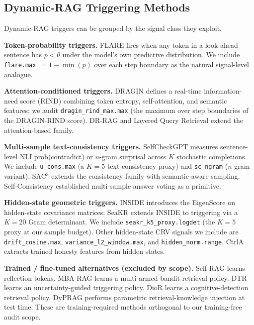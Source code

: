 \documentclass[11pt]{article}
\begin{document}
\subsection{Dynamic-RAG Triggering Methods}
\label{sec:related-triggers}

Dynamic-RAG triggers can be grouped by the signal class they exploit.

\noindent\textbf{Token-probability triggers.} FLARE \citep{Jiang_FLARE} fires
when any token in a look-ahead sentence has $p < \theta$ under the model's
own predictive distribution. We include \texttt{flare.max}~$= 1 - \min(p)$
over each step boundary as the natural signal-level analogue.

\noindent\textbf{Attention-conditioned triggers.} DRAGIN \citep{Su_DRAGIN}
defines a real-time information-need score (RIND) combining token entropy,
self-attention, and semantic features; we audit
\texttt{dragin\_rind\_max.max} (the maximum over step boundaries of the
DRAGIN-RIND score). DR-RAG \citep{Hei_DRRAG} and Layered Query Retrieval
\citep{Huang_LayeredQR} extend the attention-based family.

\noindent\textbf{Multi-sample text-consistency triggers.} SelfCheckGPT
\citep{Manakul_SelfCheckGPT} measures sentence-level NLI prob(contradict) or
$n$-gram surprisal across $K$ stochastic completions. We include
\texttt{u\_cons.max} (a $K{=}5$ text-consistency proxy) and \texttt{sc\_ngram}
($n$-gram variant). SAC$^3$ \citep{Zhang_SAC3} extends the consistency family
with semantic-aware sampling. Self-Consistency \citep{Wang_SelfConsistency}
established multi-sample answer voting as a primitive.

\noindent\textbf{Hidden-state geometric triggers.} INSIDE
\citep{Chen_INSIDE} introduces the EigenScore on hidden-state covariance
matrices; SeaKR \citep{Yao_SeaKR} extends INSIDE to triggering via a
$K{=}20$ Gram determinant. We include \texttt{seakr\_k5\_proxy.logdet} (the
$K{=}5$ proxy at our sample budget). Other hidden-state CRV signals we
include are \texttt{drift\_cosine.max}, \texttt{variance\_l2\_window.max}, and
\texttt{hidden\_norm.range}. CtrlA \citep{Liu_CtrlA} extracts trained honesty
features from hidden states.

\noindent\textbf{Trained / fine-tuned alternatives (excluded by scope).}
Self-RAG \citep{Asai_SelfRAG} learns reflection tokens. MBA-RAG
\citep{Tang_MBARAG} learns a multi-armed-bandit retrieval policy. DTR
\citep{Chen_DTR} learns an uncertainty-guided triggering policy. DioR
\citep{Guo_DioR} learns a cognitive-detection retrieval policy. DyPRAG
\citep{Su_DyPRAG} performs parametric retrieval-knowledge injection at test
time. These are training-required methods orthogonal to our training-free
audit scope.
\end{document}
